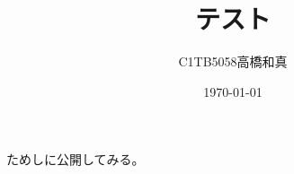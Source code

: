 \documentclass[autodetect-engine, ja=standard, 10.5pt, a4paper]{bxjsarticle}
\title{テスト}
\author{C1TB5058\:高橋和真}
\date{\today}
\begin{document}
\maketitle
ためしに公開してみる。
\end{document}
